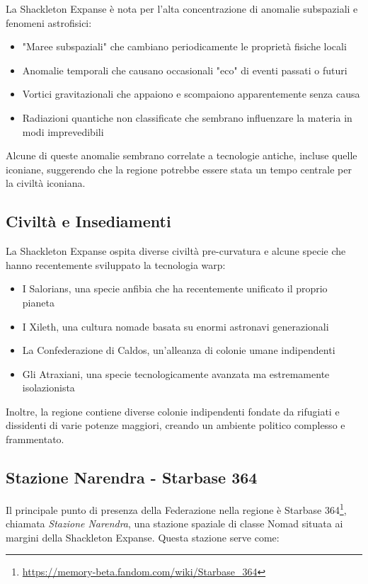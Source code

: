 \documentclass[letterpaper,twocolumn,openany,nodeprecatedcode]{dndbook}
\begin{document}
La Shackleton Expanse è nota per l'alta concentrazione di anomalie subspaziali e fenomeni astrofisici:

\begin{itemize}
    \item "Maree subspaziali" che cambiano periodicamente le proprietà fisiche locali
    \item Anomalie temporali che causano occasionali "eco" di eventi passati o futuri
    \item Vortici gravitazionali che appaiono e scompaiono apparentemente senza causa
    \item Radiazioni quantiche non classificate che sembrano influenzare la materia in modi imprevedibili
\end{itemize}

Alcune di queste anomalie sembrano correlate a tecnologie antiche, incluse quelle iconiane, suggerendo che la regione potrebbe essere stata un tempo centrale per la civiltà iconiana.

\subsection{Civiltà e Insediamenti}

La Shackleton Expanse ospita diverse civiltà pre-curvatura e alcune specie che hanno recentemente sviluppato la tecnologia warp:

\begin{itemize}
    \item I Salorians, una specie anfibia che ha recentemente unificato il proprio pianeta
    \item I Xileth, una cultura nomade basata su enormi astronavi generazionali
    \item La Confederazione di Caldos, un'alleanza di colonie umane indipendenti
    \item Gli Atraxiani, una specie tecnologicamente avanzata ma estremamente isolazionista
\end{itemize}

Inoltre, la regione contiene diverse colonie indipendenti fondate da rifugiati e dissidenti di varie potenze maggiori, creando un ambiente politico complesso e frammentato.

\subsection{Stazione Narendra - Starbase 364}

Il principale punto di presenza della Federazione nella regione è Starbase 364\footnote{\url{https://memory-beta.fandom.com/wiki/Starbase_364}}, chiamata \textit{Stazione Narendra}, una stazione spaziale di classe Nomad situata ai margini della Shackleton Expanse. Questa stazione serve come:
\end{document}
